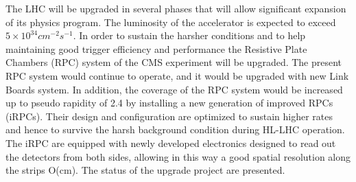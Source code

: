 The LHC will be upgraded in several phases that will allow significant expansion of its physics program. The luminosity of the accelerator is expected to exceed $5 \times 10^{34} cm^{-2}s^{-1}$.  In order to sustain the harsher conditions and to help maintaining good trigger efficiency and performance the Resistive Plate Chambers (RPC) system of the CMS experiment will be upgraded. The present RPC system would continue to operate, and it would be upgraded with new Link Boards system. In addition, the coverage of the RPC system would be increased up to pseudo rapidity of 2.4 by installing a new generation of improved RPCs (iRPCs). Their design and configuration are optimized to sustain higher rates and hence to survive the harsh background condition during HL-LHC operation. The iRPC are equipped with newly developed electronics designed to read out the detectors from both sides, allowing in this way a good spatial resolution along the strips O(cm). The status of the upgrade project are presented.